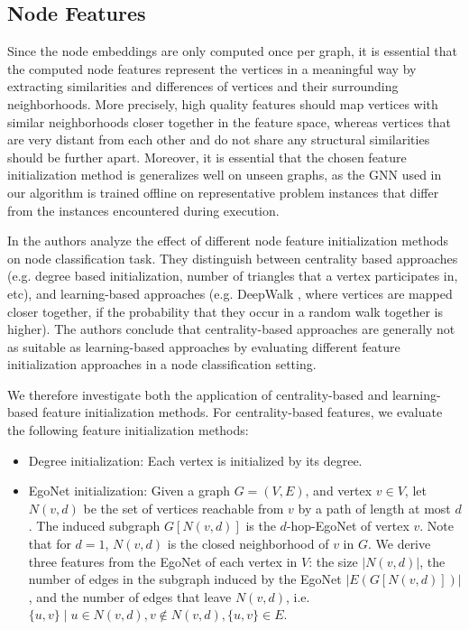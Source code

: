 \documentclass[draft,final]{vutinfth} %
\begin{document}
\subsection{Node Features}
Since the node embeddings are only computed once per graph, it is essential that the computed node features represent the vertices in a meaningful way by extracting similarities and differences of vertices and their surrounding neighborhoods. More precisely, high quality features should map vertices with similar neighborhoods closer together in the feature space, whereas vertices that are very distant from each other and do not share any structural similarities should be further apart. Moreover, it is essential that the chosen feature initialization method is generalizes well on unseen graphs, as the GNN used in our algorithm is trained offline on representative problem instances that differ from the instances encountered during execution. 

In \cite{Duong2019} the authors analyze the effect of different node feature initialization methods on node classification task. They distinguish between centrality based approaches (e.g. degree based initialization, number of triangles that a vertex participates in, etc), and learning-based approaches (e.g. DeepWalk \cite{Perozzi2014}, where vertices are mapped closer together, if the probability that they occur in a random walk together is higher). 
The authors conclude that centrality-based approaches are generally not as suitable as learning-based approaches by evaluating different feature initialization approaches in a node classification setting. 

We therefore investigate both the application of centrality-based and learning-based feature initialization methods. 
For centrality-based features, we evaluate the following feature initialization methods: 
\begin{itemize}
    \item Degree initialization: Each vertex is initialized by its degree.
    \item EgoNet initialization: Given a graph $G = (V, E)$, and vertex $v \in V$, let $N(v, d)$ be the set of vertices reachable from $v$ by a path of length at most $d$. The induced subgraph $G[N(v, d)]$ is the $d$-hop-EgoNet of vertex $v$. Note that for $d=1$, $N(v, d)$ is the closed neighborhood of $v$ in $G$. We derive three features from the EgoNet of each vertex in $V$: the size $|N(v, d)|$, the number of edges in the subgraph induced by the EgoNet $|E(G[N(v, d)])|$, and the number of edges that leave $N(v, d)$, i.e. ${\{u, v\} \mid u \in N(v,d), v \notin N(v,d), \{u,v\} \in E}$.     
\end{itemize}
\end{document}

